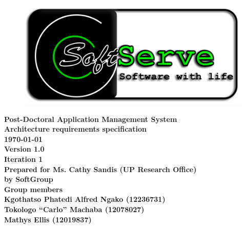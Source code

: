 \documentclass[12pt]{article}
\newcommand{\Title}{Architecture requirements specification} %
\newcommand{\ssr}{Soft\color{green}{Serve }\color{black}}
\newcommand{\version}{1.0}
\newcommand{\iteration}{1}
\newcommand{\client}{Ms. Cathy Sandis (UP Research Office)}
\newcommand{\project}{Post-Doctoral Application Management System}
\begin{document}
\vspace{4em}

\begin{center}%

\begin{figure}[ht!]
\centering
\includegraphics{../Images_Docs/logo.png}
\end{figure}
\LARGE \bf \project \\[1em]
\LARGE \bf \Title \\[0.25em]
\large \bf \today\\
\bf Version \version\\
\bf Iteration \iteration\\[0.5em]
\Large \bf Prepared for \client\\
\Large \bf by
\Large {\bf \ssr Group }\\[0.5em]
\LARGE {\bf Group members}\\[0.25em]
\large
Kgothatso Phatedi Alfred Ngako (12236731) \\[0.5em]
Tokologo “Carlo” Machaba (12078027) \\[0.5em]
Mathys Ellis (12019837) \\[8em]

\end{center}%

\end{document}
